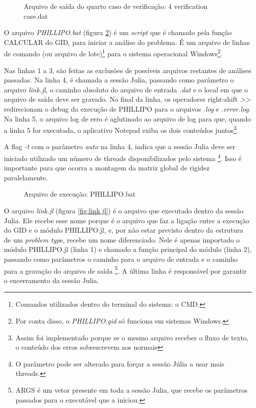 \begin{figure}[hbtp]
    \caption{Arquivo de saída do quarto caso de verificação: 4 verification case.dat}
    
    \label{fig:PHILLIPO.bas}
\end{figure}



O arquivo \emph{PHILLIPO.bat} (figura \ref{fig:PHILLIPO.bat}) é um \emph{script} que é chamado pela função CALCULAR do GID, para iniciar a análise do problema. É um arquivo de linhas de comando (ou arquivo de lote)\footnote{Comandos utilizados dentro do terminal do sistema: o CMD.} para o sistema operacional Windows\footnote{Por conta disso, o \emph{PHILLIPO.gid} só funciona em sistemas Windows.}.

Nas linhas 1 a 3, são feitas as exclusões de possíveis arquivos restantes de análises passadas. Na linha 4, é chamada a sessão Julia, passando como parâmetro o arquivo \emph{link.jl}, o caminho absoluto do arquivo de entrada \emph{.dat} e o local em que o arquivo de saída deve ser gravado. No final da linha, os operadores right-shift \emph{>>} redirecionam o debug da execução de PHILLIPO para o arquivos \emph{.log} e \emph{.error.log}. Na linha 5, o arquivo log de erro é aglutinado ao arquivo de log para que, quando a linha 5 for executada, o aplicativo Notepad exiba os dois conteúdos juntos\footnote{Assim foi implementado porque se o mesmo arquivo receber o fluxo de texto, o conteúdo dos erros sobrescrevem aos normais}. 

A flag \emph{-t} com o parâmetro \emph{auto} na linha 4, indica que a sessão Julia deve ser iniciado utilizado um número de threads disponibilizados pelo sistema \footnote{O parâmetro pode ser alterado para forçar a sessão Júlia a usar mais threads.}. Isso é importante para que ocorra a montagem da matriz global de rigidez paralelamente.

\begin{figure}[hbtp]
    \caption{Arquivo de execução: PHILLIPO.bat}
    
    \label{fig:PHILLIPO.bat}
\end{figure}

O arquivo \emph{link.jl} (figura \ref{fig:link.jl}) é o arquivo que executado dentro da sessão Julia. Ele recebe esse nome porque é o arquivo que faz a ligação entre a execução do GID e o módulo PHILLIPO.jl, e, por não estar previsto dentro da estrutura de um \emph{problem type}, recebe um nome diferenciado. Nele é apenas importado o módulo PHILLIPO.jl  (linha 1) e chamado a função principal do módulo (linha 2), passando como parâmetros o caminho para o arquivo de entrada e o caminho para a gravação do arquivo de saída \footnote{ARGS é um vetor presente em toda a sessão Julia, que recebe os parâmetros passados para o executável que a iniciou.}. A última linha é responsável por garantir o encerramento da sessão Julia.

